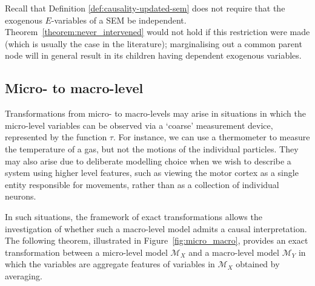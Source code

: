 Recall that Definition \ref{def:causality-updated-sem} does not require that the exogenous $E$-variables of a SEM be independent. 
Theorem~\ref{theorem:never_intervened} would not hold if this restriction were made (which is usually the case in the literature); marginalising out a common parent node will in general result in its children having dependent exogenous variables.

\subsection{Micro- to macro-level}\label{subsection:micromacro}

Transformations from micro- to macro-levels may arise in situations in which the micro-level variables can be observed via a `coarse' measurement device, represented by the function $\tau$.
For instance, we can use a thermometer to measure the temperature of a gas, but not the motions of the individual particles. 
They may also arise due to deliberate modelling choice when we wish to describe a system using higher level features, such as viewing the motor cortex as a single entity responsible for movements, rather than as a collection of individual neurons.

In such situations, the framework of exact transformations allows the investigation of whether such a macro-level model admits a causal interpretation. The following theorem, illustrated in Figure~\ref{fig:micro_macro}, provides an exact transformation between a micro-level model $\mathcal{M}_X$ and a macro-level model $\mathcal{M}_Y$ in which the variables are aggregate features of variables in $\mathcal{M}_X$ obtained by averaging.

\medskip


